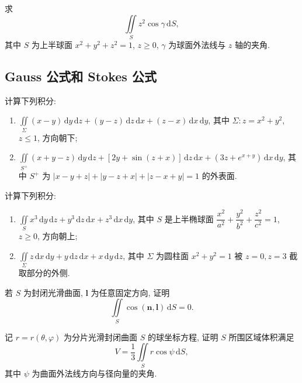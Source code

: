 \documentclass[../数学分析培优讲义.tex]{subfiles}
\begin{document}
\begin{example}
求
\[
    \iint\limits_Sz^2\cos\gamma\,\mathrm{d}S,
\]
其中 $S$ 为上半球面 $x^2+y^2+z^2=1$, $z\geq0$, $\gamma$ 为球面外法线与 $z$ 轴的夹角.
\end{example}
\exampleblank


\newpage

\subsection{Gauss 公式和 Stokes 公式}

\begin{example}
计算下列积分:
\begin{enumerate}[label=(\arabic*)]
    \item $\displaystyle\iint\limits_\Sigma(x-y)\,\mathrm{d}y\,\mathrm{d}z+(y-z)\,\mathrm{d}z\,\mathrm{d}x+(z-x)\,\mathrm{d}x\,\mathrm{d}y$, 其中 $\Sigma:z=x^2+y^2$, $z\leq1$, 方向朝下;
    \item $\displaystyle\iint\limits_{S^+}(x+y-z)\,\mathrm{d}y\,\mathrm{d}z+[2y+\sin(z+x)]\,\mathrm{d}z\,\mathrm{d}x+(3z+e^{x+y})\,\mathrm{d}x\,\mathrm{d}y$, 其中 $S^+$ 为 $|x-y+z|+|y-z+x|+|z-x+y|=1$ 的外表面.
\end{enumerate}
\end{example}
\exampleblank

\begin{example}
计算下列积分:
\begin{enumerate}[label=(\arabic*)]
    \item $\displaystyle\iint\limits_Sx^3\,\mathrm{d}y\,\mathrm{d}z+y^3\,\mathrm{d}z\,\mathrm{d}x+z^3\,\mathrm{d}x\,\mathrm{d}y$, 其中 $S$ 是上半椭球面 $\dfrac{x^2}{a^2}+\dfrac{y^2}{b^2}+\dfrac{z^2}{c^2}=1$, $z\geq0$, 方向朝上;
    \item $\displaystyle\iint\limits_\Sigma z\,\mathrm{d}x\,\mathrm{d}y+y\,\mathrm{d}z\,\mathrm{d}x+x\,\mathrm{d}y\,\mathrm{d}z$, 其中 $\Sigma$ 为圆柱面 $x^2+y^2=1$ 被 $z=0,z=3$ 截取部分的外侧.
\end{enumerate}
\end{example}
\exampleblank

\begin{example}
若 $S$ 为封闭光滑曲面, $\bm l$ 为任意固定方向, 证明
\[
    \iint\limits_S\cos(\bm n,\bm l)\,\mathrm{d}S=0.
\]
\end{example}
\exampleblank

\begin{example}
记 $r=r(\theta,\varphi)$ 为分片光滑封闭曲面 $S$ 的球坐标方程, 证明 $S$ 所围区域体积满足
\[
    V=\dfrac{1}{3}\iint\limits_Sr\cos\psi\,\mathrm{d}S,
\]
其中 $\psi$ 为曲面外法线方向与径向量的夹角.
\end{example}
\exampleblank
\end{document}
